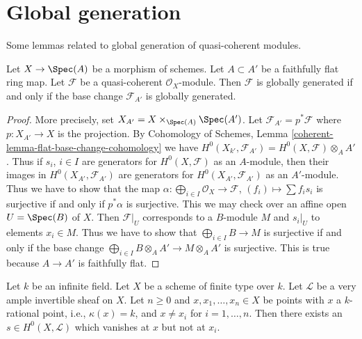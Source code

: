 \section{Global generation}
\label{section-global-generation}

\noindent
Some lemmas related to global generation of quasi-coherent modules.

\begin{lemma}
\label{lemma-globally-generated-base-change}
Let $X \to \Spec(A)$ be a morphism of schemes. Let $A \subset A'$
be a faithfully flat ring map. Let $\mathcal{F}$ be a quasi-coherent
$\mathcal{O}_X$-module. Then $\mathcal{F}$ is globally generated
if and only if the base change $\mathcal{F}_{A'}$ is globally generated.
\end{lemma}

\begin{proof}
More precisely, set $X_{A'} = X \times_{\Spec(A)} \Spec(A')$.
Let $\mathcal{F}_{A'} = p^*\mathcal{F}$ where $p : X_{A'} \to X$
is the projection. By
Cohomology of Schemes, Lemma \ref{coherent-lemma-flat-base-change-cohomology}
we have
$H^0(X_{k'}, \mathcal{F}_{A'}) = H^0(X, \mathcal{F}) \otimes_A A'$.
Thus if $s_i$, $i \in I$ are generators for $H^0(X, \mathcal{F})$
as an $A$-module, then their images in $H^0(X_{A'}, \mathcal{F}_{A'})$
are generators for $H^0(X_{A'}, \mathcal{F}_{A'})$ as an $A'$-module.
Thus we have to show that the map
$\alpha : \bigoplus_{i \in I} \mathcal{O}_X \to \mathcal{F}$,
$(f_i) \mapsto \sum f_i s_i$
is surjective if and only if $p^*\alpha$ is surjective.
This we may check over an affine open $U = \Spec(B)$ of $X$.
Then $\mathcal{F}|_U$ corresponds to a $B$-module $M$
and $s_i|_U$ to elements $x_i \in M$. Thus we have to show
that $\bigoplus_{i \in I} B \to M$ is surjective if and only
if the base change $\bigoplus_{i \in I} B \otimes_A A' \to M \otimes_A A'$
is surjective. This is true because $A \to A'$ is faithfully flat.
\end{proof}

\begin{lemma}
\label{lemma-very-ample-vanish-at-point}
Let $k$ be an infinite field. Let $X$ be a scheme of finite type over $k$.
Let $\mathcal{L}$ be a very ample invertible sheaf on $X$.
Let $n \geq 0$ and $x, x_1, \ldots, x_n \in X$ be points with
$x$ a $k$-rational point, i.e., $\kappa(x) = k$, and
$x \not = x_i$ for $i = 1, \ldots, n$.
Then there exists an $s \in H^0(X, \mathcal{L})$ which vanishes at
$x$ but not at $x_i$.
\end{lemma}

